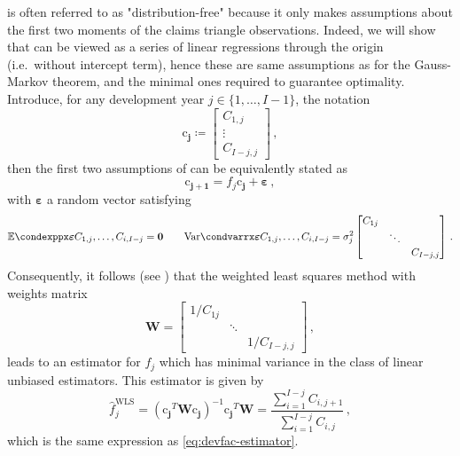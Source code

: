\documentclass[a4paper]{book}
\begin{document}
 is often referred to as "distribution-free" because it only makes assumptions about the first two moments of the claims triangle observations. Indeed, we will show that  can be viewed as a series of linear regressions through the origin (i.e.\ without intercept term), hence these are same assumptions as for the Gauss-Markov theorem, and the minimal ones required to guarantee optimality. Introduce, for any development year $j \in \{ 1, \dots, {I - 1} \}$, the notation
\begin{equation}
  \bm{\mathrm{c}_j} \coloneqq
  \begin{bmatrix}
    C_{1, j} \\
    \vdots   \\
    C_{I - j, j}
  \end{bmatrix} \,,
\end{equation}
then the first two assumptions of  can be equivalently stated as
\begin{equation}
  \bm{\mathrm{c}_{j + 1}} = f_j \bm{\mathrm{c}_j} + \bm{\varepsilon} \,,
\end{equation}
with $\bm{\varepsilon}$ a random vector satisfying
\begin{equation}
  \condexpp{\bm{\varepsilon}}{C_{1, j}, \dots, C_{i, I - j}} = \bm{0}
  \qquad%
  \condvarr{\bm{\varepsilon}}{C_{1, j}, \dots, C_{i, I - j}} = \sigma^2_j
  \begin{bmatrix}
    C_{1j} &        &              \\
           & \ddots &              \\
           &        & C_{I - j, j}
  \end{bmatrix} \,.
\end{equation}
Consequently, it follows (see \cite[Proposition 1.7]{hayashi}) that the weighted least squares method with weights matrix
\begin{equation}
  \mathbf{W} =
  \begin{bmatrix}
    1 / C_{1j} &        &                  \\
               & \ddots &                  \\
               &        & 1 / C_{I - j, j}
  \end{bmatrix} \,,
\end{equation}
leads to an estimator for $f_j$ which has minimal variance in the class of linear unbiased estimators. This estimator is given by
\begin{equation}
  \widehat{f}^{\mathrm{WLS}}_j = (\bm{\mathrm{c}_j}^T \mathbf{W} \bm{\mathrm{c}_j})^{-1} \bm{\mathrm{c}_j}^T \mathbf{W} = \frac{\sum_{i = 1}^{I - j} C_{i, j + 1}}{\sum_{i = 1}^{I - j} C_{i, j}} \,,
\end{equation}
which is the same expression as \cref{eq:devfac-estimator}.
\end{document}
